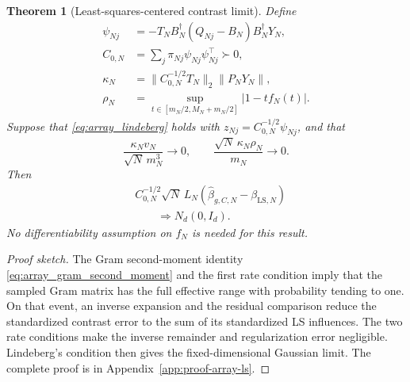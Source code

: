 \documentclass[pdflatex,iicol,sn-mathphys-ay]{sn-jnl}
\theoremstyle{thmstyleone}
\newtheorem{theorem}{Theorem}
\theoremstyle{thmstylethree}
\theoremstyle{thmstyletwo}
\begin{document}
\begin{theorem}[Least-squares-centered contrast limit]
\label{thm:array_ls_clt}
Define
\begin{equation}
 \begin{aligned}
 \psi_{Nj}&=-T_NB_N^\dagger(Q_{Nj}-B_N)B_N^\dagger Y_N,\\
 C_{0,N}&=\sum_j\pi_{Nj}\psi_{Nj}\psi_{Nj}^\top\succ0,\\
 \kappa_N&=\|C_{0,N}^{-1/2}T_N\|_2\|P_NY_N\|,\\
 \rho_N&=\sup_{t\in[m_N/2,M_N+m_N/2]}|1-tf_N(t)|.
 \end{aligned}
 \label{eq:array_ls_quantities}
\end{equation}
Suppose that \eqref{eq:array_lindeberg} holds with
\(z_{Nj}=C_{0,N}^{-1/2}\psi_{Nj}\), and that
\begin{equation}
 \frac{\kappa_Nv_N}{\sqrt N\,m_N^3}\longrightarrow0,
 \qquad
 \frac{\sqrt N\,\kappa_N\rho_N}{m_N}\longrightarrow0.
 \label{eq:array_ls_rates}
\end{equation}
Then
\begin{equation}
 \begin{aligned}
 &C_{0,N}^{-1/2}\sqrt N\,L_N
 (\widehat\beta_{g,C,N}-\beta_{\mathrm{LS},N})\\
 &\qquad\Longrightarrow N_d(0,I_d).
 \end{aligned}
 \label{eq:array_ls_limit}
\end{equation}
No differentiability assumption on \(f_N\) is needed for this result.
\end{theorem}
\begin{proof}[Proof sketch]
The Gram second-moment identity
\eqref{eq:array_gram_second_moment} and the first rate condition imply that
the sampled Gram matrix has the full effective range with probability
tending to one. On that event, an inverse expansion and the residual
comparison reduce the standardized contrast error to the sum of its
standardized LS influences. The two rate conditions make the inverse
remainder and regularization error negligible. Lindeberg's condition then
gives the fixed-dimensional Gaussian limit.
The complete proof is in Appendix~\ref{app:proof-array-ls}.
\end{proof}
\end{document}
